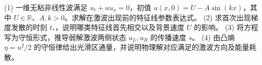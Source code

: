 (1) 一维无粘非线性波满足 \(u_t+u u_x=0\)，初值 \(u(x,0)=U-A\sin(kx)\)，其中 \(U\in\mathbb R\)、\(A,k>0\)。求解在激波出现前的特征线参数表达式。
(2) 求首次出现梯度发散的时刻 \(t_*\)，说明哪类特征线首先相交以及背景速度 \(U\) 的影响。
(3) 将方程写为守恒形式，推导弱解激波两侧状态 \(u_L,u_R\) 的传播速度 \(s\)。
(4) 由凸熵 \(\eta=u^2/2\) 的守恒律给出光滑区通量，并说明物理解对应满足的激波方向及能量耗散。
